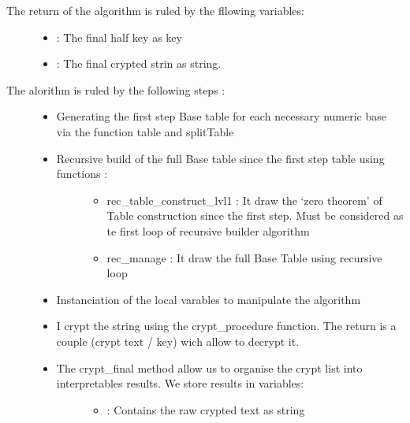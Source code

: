 \documentclass[letterpaper,10pt,english]{sphinxmanual}
\begin{document}
\begin{description}
\item[{The return of the algorithm is ruled by the fllowing variables:}] \leavevmode\begin{itemize}
\item {} 
\sphinxAtStartPar
{} : The final half key as key

\item {} 
\sphinxAtStartPar
{} : The final crypted strin as string.

\end{itemize}

\item[{The alorithm is ruled by the following steps :}] \leavevmode\begin{itemize}
\item {} 
\sphinxAtStartPar
Generating the first step Base table for each necessary numeric base via the function table and splitTable

\item {} \begin{description}
\item[{Recursive build of the full Base table since the first step table using functions :}] \leavevmode\begin{itemize}
\item {} 
\sphinxAtStartPar
rec\_table\_construct\_lvl1 : It draw the ‘zero theorem’ of Table construction since the first step. Must be considered as te first loop of recursive builder algorithm

\item {} 
\sphinxAtStartPar
rec\_manage : It draw the full Base Table using recursive loop

\end{itemize}

\end{description}

\item {} 
\sphinxAtStartPar
Instanciation of the local varables to manipulate the algorithm

\item {} 
\sphinxAtStartPar
I crypt the string using the crypt\_procedure function. The return is a couple (crypt text / key) wich allow to decrypt it.

\item {} \begin{description}
\item[{The crypt\_final method allow us to organise the crypt list into interpretables results. We store results in variables:}] \leavevmode\begin{itemize}
\item {} 
\sphinxAtStartPar
{} : Contains the raw crypted text as string


\end{itemize}
\end{description}
\end{itemize}
\end{description}
\end{document}
